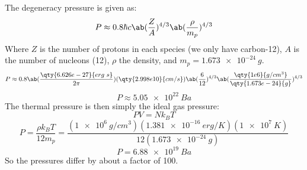 The degeneracy pressure is given as:
\begin{equation}
    P \approx 0.8\hbar c \ab(\frac{Z}{A})^{4/3}\ab(\frac{\rho}{m_p})^{4/3}
\end{equation}
Where $Z$ is the number of protons in each species (we only have carbon-12), $A$ is the number of nucleons (12), $\rho$ the density, and $m_p = \qty{1.673e-24}{g}$.
\begin{equation}
    P \approx 0.8 \ab(\frac{\qty{6.626e-27}{erg\ s}}{2\pi})(\qty{2.998e10}{cm/s})\ab(\frac{6}{12})^{4/3}\ab(\frac{\qty{1e6}{g/cm^3}}{\qty{1.673e-24}{g}})^{4/3}
\end{equation}
\begin{equation}
    \boxed{P \approx \qty{5.05e22}{Ba}}
\end{equation}
The thermal pressure is then simply the ideal gas pressure:
\begin{equation}
    PV = Nk_B T
\end{equation}
\begin{equation}
    P = \frac{\rho k_B T}{12m_p} = \frac{(\qty{1e6}{g/cm^3})(\qty{1.381e-16}{erg/K})(\qty{1e7}{K})}{12(\qty{1.673e-24}{g})}
\end{equation}
\begin{equation}
    \boxed{P = \qty{6.88e19}{Ba}}
\end{equation}
So the pressures differ by about a factor of 100.